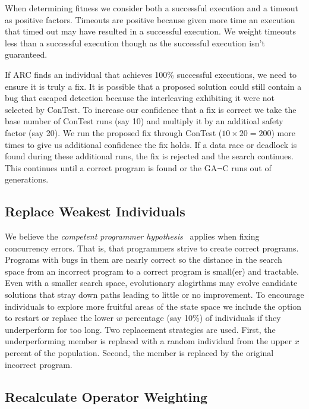 \documentclass{llncs}
\begin{document}
\noindent When determining fitness we consider both a successful execution and a timeout as positive factors. Timeouts are positive because given more time an execution that timed out may have resulted in a successful execution. We weight timeouts less than a successful execution though as the successful execution isn't guaranteed.

If ARC finds an individual that achieves 100\% successful executions, we need to ensure it is truly a fix. It is possible that a proposed solution could still contain a bug that escaped detection because the interleaving exhibiting it were not selected by ConTest. To increase our confidence that a fix is correct we take the base number of ConTest runs (say 10) and multiply it by an additioal safety factor (say 20). We run the proposed fix through ConTest ($10 \times 20 = 200$) more times to give us additional confidence the fix holds.  If a data race or deadlock is found during these additional runs, the fix is rejected and the search continues. This continues until a correct program is found or the GA$\neg$C runs out of generations.

\subsection{Replace Weakest Individuals}
\label{sec:replace_weakest_individuals}

We believe the \textit{competent programmer hypothesis}~\cite{ABD+79} applies when fixing concurrency errors.  That is, that programmers strive to create correct programs.  Programs with bugs in them are nearly correct so the distance in the search space from an incorrect program to a correct program is small(er) and tractable.  Even with a smaller search space, evolutionary alogirthms may evolve candidate solutions that stray down paths leading to little or no improvement. To encourage individuals to explore more fruitful areas of the state space we include the option to restart or replace the lower $w$ percentage (say 10\%) of individuals if they underperform for too long.  Two replacement strategies are used. First, the underperforming member is replaced with a random individual from the upper $x$ percent of the population. Second, the member is replaced by the original incorrect program.

\subsection{Recalculate Operator Weighting}
\label{sec:recalculate_operator_weighting}
\end{document}
